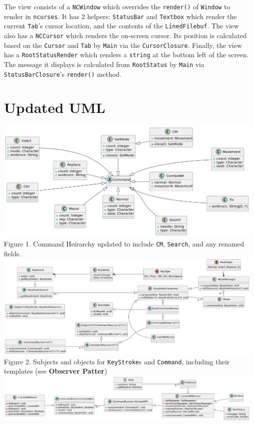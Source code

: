 \documentclass{article}
\begin{document}
\quad The view consists of a \texttt{NCWindow} which overrides the 
\texttt{render()} of \texttt{Window} to render in \texttt{ncurses}. 
It has 2 helpers: \texttt{StatusBar} and \texttt{Textbox}
which render the current \texttt{Tab}'s cursor location, 
and the contents of the \texttt{LinedFilebuf}. 
The view also has a \texttt{NCCursor} which renders the on-screen cursor. 
Its position is calculated based on the \texttt{Cursor} and \texttt{Tab} 
by \texttt{Main} via the \texttt{CursorClosure}. 
Finally, the view has a \texttt{RootStatusRender} 
which renders a \texttt{string} at the bottom left of the screen. 
The message it displays is calculated from \texttt{RootStatus} 
by \texttt{Main} via \texttt{StatusBarClosure}'s 
\texttt{render()} method.  

\section{Updated UML}
\includegraphics[width=\textwidth]{uml1}
Figure 1. Command Heirarchy updated to include \texttt{CM}, 
\texttt{Search}, and any renamed fields. 
\\\includegraphics[width=\textwidth]{uml2}
Figure 2. Subjects and objects for \texttt{KeyStroke}s and 
\texttt{Command}, including their templates (see \textbf{Observer Patter})
\\\includegraphics[width=\textwidth]{uml4}
\end{document}
